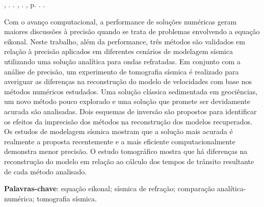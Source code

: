 \setlength{\absparsep}{18pt} %
\begin{resumo}
    \fonteResumo

\begin{flushleft}
\MakeUppercase{\imprimirSobrenome}, \imprimirPrimeirosNomes. \textbf{\imprimirtitulo}. \imprimirtipotrabalho, \imprimirinstituicao. \imprimirlocal,  p. \pageref{LastPage}. \imprimirAnoDeDefesa.
\end{flushleft}

	Com o avanço computacional, a performance de soluções numéricas geram maiores discussões à precisão quando se trata de problemas envolvendo a equação eikonal. Neste trabalho, além da performance, três métodos são validados em relação à precisão aplicados em diferentes cenários de modelagem sísmica utilizando uma solução analítica para ondas refratadas. Em conjunto com a análise de precisão, um experimento de tomografia sísmica é realizado para averiguar as diferenças na reconstrução do modelo de velocidades com base nos métodos numéricos estudados. Uma solução clássica sedimentada em geociências, um novo método pouco explorado e uma solução que promete ser devidamente acurada são analisadas. Dois esquemas de inversão são propostos para identificar os efeitos da imprecisão dos métodos na reconstrução dos modelos recuperados. Os estudos de modelagem sísmica mostram que a solução mais acurada é realmente a proposta recentemente e a mais eficiente computacionalmente demonstra menor precisão. O estudo tomográfico mostra que há diferenças na reconstrução do modelo em relação ao cálculo dos tempos de trânsito resultante de cada método analisado.     
	
    \textbf{Palavras-chave}: equação eikonal; sísmica de refração; comparação analítica-numérica; tomografia sísmica.
\end{resumo}
